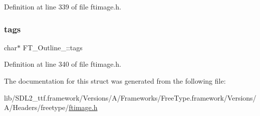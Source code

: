 Definition at line 339 of file ftimage.\+h.

\mbox{\label{struct_f_t___outline___ac84ca66907361e1f49ec11c14720087a}} 
\subsubsection{\texorpdfstring{tags}{tags}}
{\footnotesize\ttfamily char$\ast$ F\+T\+\_\+\+Outline\+\_\+\+::tags}



Definition at line 340 of file ftimage.\+h.



The documentation for this struct was generated from the following file\+:\begin{DoxyCompactItemize}
\item 
lib/\+S\+D\+L2\+\_\+ttf.\+framework/\+Versions/\+A/\+Frameworks/\+Free\+Type.\+framework/\+Versions/\+A/\+Headers/freetype/\mbox{\hyperlink{ftimage_8h}{ftimage.\+h}}\end{DoxyCompactItemize}
